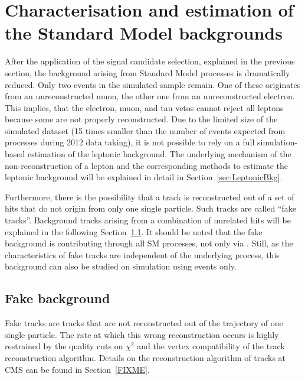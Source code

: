 \newpage
\chapter{Characterisation and estimation of the Standard Model backgrounds}
\label{sec:BackgroundEstimation}
After the application of the signal candidate selection, explained in the previous section, the background arising from Standard Model processes is dramatically reduced.
Only two events in the simulated \WJets sample remain.
One of these originates from an unreconstructed muon, the other one from an unreconstructed electron.
This implies, that the electron, muon, and tau vetos cannot reject all leptons because some are not properly reconstructed.
Due to the limited size of the simulated \WJets dataset (15 times smaller than the number of events expected from \WJets processes during 2012 data taking), 
it is not possible to rely on a full simulation-based estimation of the leptonic background.
The underlying mechanism of the non-reconstruction of a lepton and the corresponding methods to estimate the leptonic background will be explained in detail in Section~\ref{sec:LeptonicBkg}.

Furthermore, there is the possibility that a track is reconstructed out of a set of hits that do not origin from only one single particle.
Such tracks are called ``fake tracks''. 
Background tracks arising from a combination of unrelated hits will be explained in the following Section~\ref{sec:FakeBkg}.
It should be noted that the fake background is contributing through all SM processes, not only via \WJets.
Still, as the characteristics of fake tracks are independent of the underlying process, this background can also be studied on simulation using \WJets events only.



\section{Fake background}
\label{sec:FakeBkg}
Fake tracks are tracks that are not reconstructed out of the trajectory of one single particle.
The rate at which this wrong reconstruction occurs is highly restrained by the quality cuts on $\chi^2$ and the vertex compatibility of the track reconstruction algorithm.
Details on the reconstruction algorithm of tracks at CMS can be found in Section~\ref{FIXME}.

